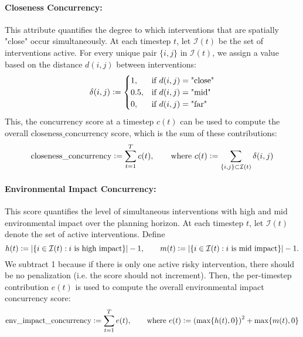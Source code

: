 \paragraph{Closeness Concurrency:} This attribute quantifies the degree to which interventions that are spatially "close" occur simultaneously. At each timestep \(t\), let \(\mathcal{I}(t)\) be the set of interventions active. For every unique pair \(\{i,j\}\) in \(\mathcal{I}(t)\), we assign a value based on the distance \(d(i,j)\) between interventions:
\[
\delta(i,j) \mathrel{\mathop:}= 
\begin{cases}
1, & \text{if } d(i,j)=\text{"close"} \\
0.5, & \text{if } d(i,j)=\text{"mid"} \\
0, & \text{if } d(i,j)=\text{"far"}
\end{cases}
\]
This, the concurrency score at a timestep \(c(t)\) can be used to compute the overall \(\text{closeness\_concurrency}\) score, which is the sum of these contributions:
\[
    \text{closeness\_concurrency} \mathrel{\mathop:}= \sum_{t=1}^{T} c(t), \qquad \text{where }
c(t) \mathrel{\mathop:}= \sum_{\{i,j\}\subset \mathcal{I}(t)} \delta(i,j)
\]


\paragraph{Environmental Impact Concurrency:} This score quantifies the level of simultaneous interventions with high and mid environmental impact over the planning horizon. At each timestep \(t\), let \(\mathcal{I}(t)\) denote the set of active interventions. Define  
\[
h(t) \mathrel{\mathop:}= \left|\{ i \in \mathcal{I}(t) : i \text{ is high impact}\}\right|-1,\qquad
m(t) \mathrel{\mathop:}= \left|\{ i \in \mathcal{I}(t) : i \text{ is mid impact}\}\right|-1.
\]
We subtract 1 because if there is only one active risky intervention, there should be no penalization (i.e. the score should not increment). Then, the per-timestep contribution $e(t)$ is used to compute the overall environmental impact concurrency score:
\[
    \text{env\_impact\_concurrency} \mathrel{\mathop:}= \sum_{t=1}^{T} e(t), \qquad \text{where }e(t) \mathrel{\mathop:}= \left(\max\{h(t),0\}\right)^2 + \max\{m(t),0\}
\]

